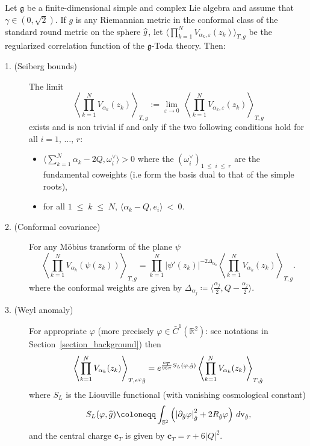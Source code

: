 \documentclass[AHL,Unicode,longabstracts,published]{cedram}
\renewcommand{\leq}{\;\leqslant\;}
\newcommand{\frkg}{\mathfrak{g}}
\newcommand{\rmv}{\mathrm{v}}
\newcommand{\R}{\mathbb{R}}
\renewcommand*\S{\mathbb{S}}
\newcommand{\bfc}{\mathbf{c}}
\newcommand{\ps}[1]{\langle #1 \rangle}
\newcommand*\eps{\varepsilon}
\let\oldhat\hat
\renewcommand*{\hat}[1]{\mathchoice{\widehat{#1}}{\widehat{#1}}{\oldhat{#1}}{\oldhat{#1}}}
\begin{document}
\begin{theo}\label{construction}
Let $\frkg$ be a finite-dimensional simple and complex Lie algebra and assume that $\gamma\in(0,\sqrt 2)$. If $g$ is any Riemannian metric in the conformal class of the standard round metric on the sphere $\hat g$, let $\langle \prod_{k=1}^NV_{\alpha_k,\eps}(z_k)\rangle_{T,g} $ be the regularized correlation function of the $\frkg$-Toda theory. Then:
\begin{description}
\item[1. (Seiberg bounds)] The limit
\begin{equation*}
\left\langle \prod_{k=1}^NV_{\alpha_k}(z_k)\right\rangle_{T,g}:= \underset{\eps \to 0}{\lim} \: \left\langle \prod_{k=1}^NV_{\alpha_k,\eps}(z_k)\right\rangle_{T,g}
\end{equation*}
exists and is non trivial if and only if the two following conditions hold for all ${i=1,\,\dots,\,r}$:
\begin{itemize}
\item $\ps{\sum_{k=1}^N\alpha_k-2Q,\omega_i^\vee} >0$ where the $(\omega_i^\vee)_{1\leq i\leq r}$ are the fundamental cowei\-ghts (i.e form the basis dual to that of the simple roots),
\item for all $1\leq k\leq N$, $ \langle\alpha_k-Q, e_i \rangle \: < \: 0$.
\end{itemize}
\item[2. (Conformal covariance)] For any M\"obius transform of the plane $\psi$
\begin{equation*}
\left\langle \prod_{k=1}^NV_{\alpha_k}(\psi (z_k))\right\rangle_{T,g}= \prod_{k=1}^N\left|\psi'(z_k)\right|^{-2\Delta_{\alpha_k}}\left\langle \prod_{k=1}^NV_{\alpha_k}(z_k) \right\rangle_{T,g}.
\end{equation*}
where the conformal weights are given by $\Delta_{\alpha_j}\coloneqq \ps{ \frac{\alpha_j}2, Q-\frac{\alpha_j}{2}}$.
\item[3. (Weyl anomaly)] For appropriate $\varphi$ (more precisely $\varphi\in\bar{C}^1(\R^2)$: see notations in Section~\ref{section_background}) then
\begin{equation*}
\left\langle \prod_{k=1}^NV_{\alpha_k}(z_k)\right\rangle_{T,e^\varphi \hat g} =e^{ \frac{\bfc_T}{96 \pi}S_L(\varphi,\hat g) } \left\langle \prod_{k=1}^NV_{\alpha_k}(z_k)\right\rangle_{T,\hat{g}}
\end{equation*}
where $S_L$ is the Liouville functional (with vanishing cosmological constant)
\[
S_L(\varphi,\hat g)\coloneqq \int_{\S^2 }\left(\left|\partial_{\hat{g}} \varphi\right|^2_{\hat{g}} + 2 R_{\hat{g}} \varphi \right) \,d\rmv_{\hat{g}},
\]
and the central charge $\bfc_T$ is given by $\bfc_T= r+ 6 |Q|^2 $.
\end{description}
\end{theo}
\end{document}
